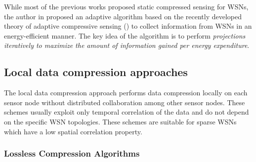 While most of the previous works proposed \textcolor[rgb]{0,0,1}{static compressed sensing} for WSNs, the author in \cite{Chou2009} proposed an adaptive algorithm based on the recently developed theory of adaptive compressive sensing (\cite{Ji2008, Kho2009}) to \textcolor[rgb]{1,0,0}{collect information from WSNs in an energy-efficient manner}. The key idea of the algorithm is to perform \emph{\textcolor[rgb]{1,0,0}{projections iteratively to maximize the amount of information gained per energy expenditure}}. 


\subsection{Local data compression approaches}
The local data compression approach performs data compression locally on each sensor node without distributed collaboration among other sensor nodes. These schemes usually exploit \textcolor[rgb]{1,0,0}{only temporal correlation of the data} and \textcolor[rgb]{1,0,0}{do not depend on the specific WSN topologies}. These schemes are suitable for \textcolor[rgb]{1,0,0}{sparse WSNs which have a low spatial correlation property}. 

\subsubsection{Lossless Compression Algorithms}

